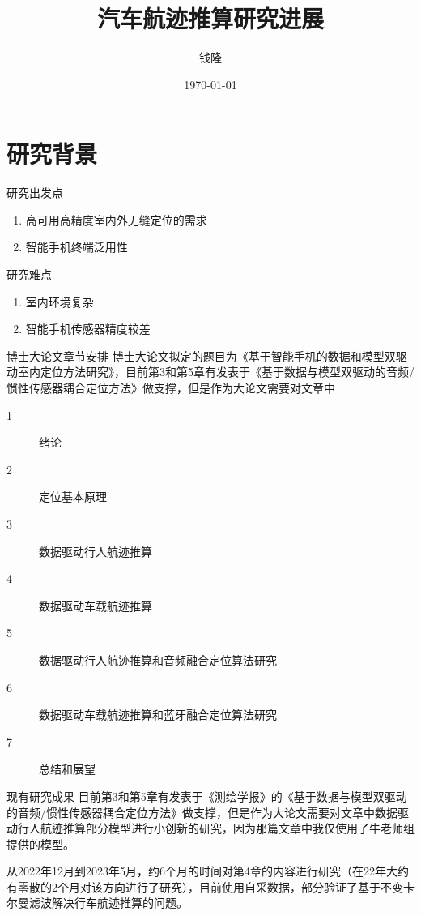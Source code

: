 \documentclass{beamer} %
\title{汽车航迹推算研究进展}
\author{钱隆}
\institute{武汉大学测绘遥感信息工程国家重点实验室}
\date{\today}
\begin{document}
\kaishu

\begin{frame} %
    \titlepage
\end{frame}

\begin{frame}
    \tableofcontents[sectionstyle=show,subsectionstyle=show/shaded/hide,subsubsectionstyle=show/shaded/hide]
\end{frame}


\section{研究背景}

\begin{frame}
    研究出发点
    \begin{enumerate}
        \item 高可用高精度室内外无缝定位的需求
        \item 智能手机终端泛用性
    \end{enumerate}
    研究难点
    \begin{enumerate}
        \item 室内环境复杂
        \item 智能手机传感器精度较差
    \end{enumerate}
\end{frame}

\begin{frame}{博士大论文章节安排}
    博士大论文拟定的题目为《基于智能手机的数据和模型双驱动室内定位方法研究》，目前第3和第5章有发表于《基于数据与模型双驱动的音频/惯性传感器耦合定位方法》做支撑，但是作为大论文需要对文章中
    \begin{description}
        \item[1] 绪论
        \item[2] 定位基本原理
        \item[3] 数据驱动行人航迹推算
        \item[4] 数据驱动车载航迹推算
        \item[5] 数据驱动行人航迹推算和音频融合定位算法研究
        \item[6] 数据驱动车载航迹推算和蓝牙融合定位算法研究
        \item[7] 总结和展望
    \end{description}
\end{frame}

\begin{frame}{现有研究成果}
    目前第3和第5章有发表于《测绘学报》的《基于数据与模型双驱动的音频/惯性传感器耦合定位方法》做支撑，但是作为大论文需要对文章中数据驱动行人航迹推算部分模型进行小创新的研究，因为那篇文章中我仅使用了牛老师组提供的模型。
    
    从2022年12月到2023年5月，约6个月的时间对第4章的内容进行研究（在22年大约有零散的2个月对该方向进行了研究），目前使用自采数据，部分验证了基于不变卡尔曼滤波解决行车航迹推算的问题。

\end{frame}
\end{document}
